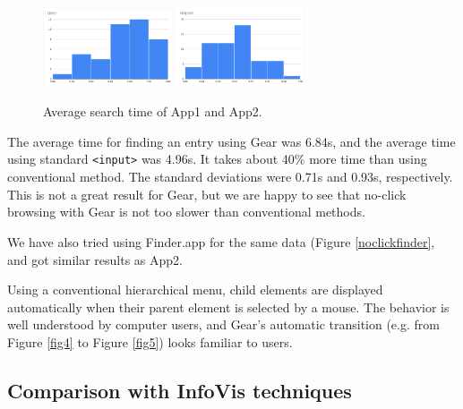 \documentclass[conference]{IEEEtran}
\begin{document}
\begin{figure}[H]
\centerline{
  \includegraphics[width=38mm,bb=0 0 960 593]{figures/6c39f199b341e30ffc28850afbd90a5a.png}
  \includegraphics[width=38mm,bb=0 0 960 593]{figures/de3f0545e0d0d8dfb9708d2420fb5407.png}
}
\caption{Average search time of App1 and App2.}
\label{monorailtime}
\end{figure}

The average time for finding an entry using Gear was 6.84s,
and the average time using standard \verb+<input>+ was 4.96s.
It takes about 40\% more time than using conventional method.
The standard deviations were 0.71s and 0.93s, respectively.
%
This is not a great result for Gear,
but we are happy to see that
no-click browsing with Gear is not too slower than
conventional methods.

We have also tried using Finder.app for the same data (Figure \ref{noclickfinder}, and
got similar results as App2.


Using a conventional hierarchical menu,
child elements are displayed automatically when their parent element is selected by a mouse.
The behavior is well understood by computer users,
and Gear's automatic transition (e.g. from Figure \ref{fig4} to Figure \ref{fig5})
looks familiar to users.

\subsection{Comparison with InfoVis techniques}
\end{document}
